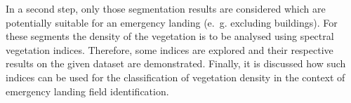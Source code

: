 In a second step, only those segmentation results are considered which are potentially suitable for an emergency landing (e.~g. excluding buildings). For these segments the density of the vegetation is to be analysed using spectral vegetation indices. Therefore, some indices are explored and their respective results on the given dataset are demonstrated. Finally, it is discussed how such indices can be used for the classification of vegetation density in the context of emergency landing field identification.

\newpage